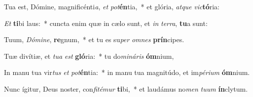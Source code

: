 \item Tua est, Dómine, magnificénti\textit{a}, \textit{et} \textit{pot}\textbf{én}tia,~* et glória, \textit{at}\textit{que} \textit{vic}\textbf{tó}ria:
\item \textit{Et} \textbf{ti}bi laus:~* cuncta enim quæ in cælo sunt, et \textit{in} \textit{ter}\textit{ra}, \textbf{tu}a sunt:
\item Tuum, \textit{Dó}\textit{mi}\textit{ne}, \textbf{re}gnum,~* et tu es su\textit{per} \textit{om}\textit{nes} \textbf{prín}cipes.
\item Tuæ divítiæ, et \textit{tu}\textit{a} \textit{est} \textbf{gló}ria:~* tu do\textit{mi}\textit{ná}\textit{ris} \textbf{óm}nium,
\item In manu tua vir\textit{tus} \textit{et} \textit{pot}\textbf{én}tia:~* in manu tua magnitúdo, et im\textit{pé}\textit{ri}\textit{um} \textbf{óm}nium.
\item Nunc ígitur, Deus noster, con\textit{fi}\textit{té}\textit{mur} \textbf{ti}bi,~* et laudámus no\textit{men} \textit{tu}\textit{um} \textbf{ín}clytum.
